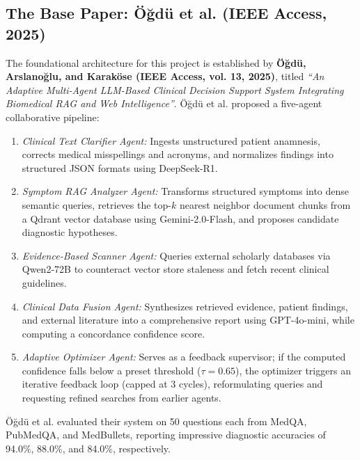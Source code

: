\documentclass[12pt,a4paper]{report}
\begin{document}
\subsection{The Base Paper: Öğdü et al. (IEEE Access, 2025)}
The foundational architecture for this project is established by \textbf{Öğdü, Arslanoğlu, and Karaköse (IEEE Access, vol. 13, 2025)}, titled \textit{``An Adaptive Multi-Agent LLM-Based Clinical Decision Support System Integrating Biomedical RAG and Web Intelligence''}. Öğdü et al. proposed a five-agent collaborative pipeline:
\begin{enumerate}
    \item \textit{Clinical Text Clarifier Agent:} Ingests unstructured patient anamnesis, corrects medical misspellings and acronyms, and normalizes findings into structured JSON formats using DeepSeek-R1.
    \item \textit{Symptom RAG Analyzer Agent:} Transforms structured symptoms into dense semantic queries, retrieves the top-$k$ nearest neighbor document chunks from a Qdrant vector database using Gemini-2.0-Flash, and proposes candidate diagnostic hypotheses.
    \item \textit{Evidence-Based Scanner Agent:} Queries external scholarly databases via Qwen2-72B to counteract vector store staleness and fetch recent clinical guidelines.
    \item \textit{Clinical Data Fusion Agent:} Synthesizes retrieved evidence, patient findings, and external literature into a comprehensive report using GPT-4o-mini, while computing a concordance confidence score.
    \item \textit{Adaptive Optimizer Agent:} Serves as a feedback supervisor; if the computed confidence falls below a preset threshold ($\tau = 0.65$), the optimizer triggers an iterative feedback loop (capped at 3 cycles), reformulating queries and requesting refined searches from earlier agents.
\end{enumerate}

Öğdü et al. evaluated their system on 50 questions each from MedQA, PubMedQA, and MedBullets, reporting impressive diagnostic accuracies of 94.0\%, 88.0\%, and 84.0\%, respectively. 
\end{document}
